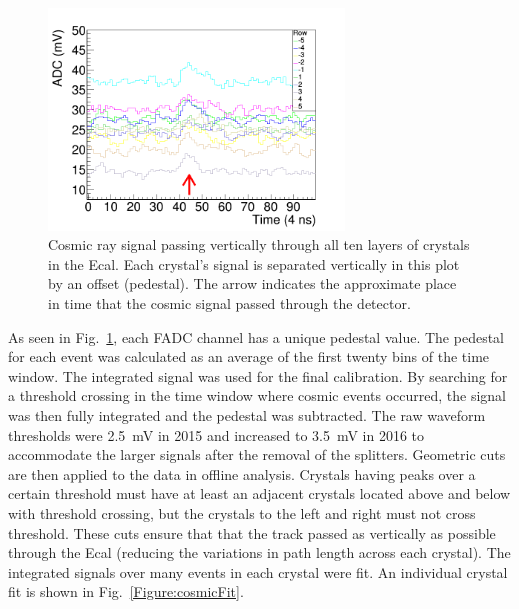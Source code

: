 \documentclass[12pt]{report}
\begin{document}
\begin{figure}[H]
  \centering
      \includegraphics[width=0.7\textwidth]{pics/performance/cosmicSignal.png}
  \caption[Real cosmic ray signal in raw FADC waveform passing vertically through Ecal]{Cosmic ray signal passing vertically through all ten layers of crystals in the Ecal. Each crystal's signal is separated vertically in this plot by an offset (pedestal). The arrow indicates the approximate place in time that the cosmic signal passed through the detector.}
  \label{Figure:cosmicSig}
\end{figure}

As seen in Fig.~\ref{Figure:cosmicSig}, each FADC channel has a unique pedestal value. The pedestal for each event was calculated as an average of the first twenty bins of the time window. The integrated signal was used for the final calibration. By searching for a threshold crossing in the time window where cosmic events occurred, the signal was then fully integrated and the pedestal was subtracted. The raw waveform thresholds were 2.5~mV in 2015 and increased to 3.5~mV in 2016 to accommodate the larger signals after the removal of the splitters. Geometric cuts are then applied to the data in offline analysis. Crystals having peaks over a certain threshold must have at least an adjacent crystals located above and below with threshold crossing, but the crystals to the left and right must not cross threshold. These cuts ensure that that the track passed as vertically as possible through the Ecal (reducing the variations in path length across each crystal). The integrated signals over many events in each crystal were fit. An individual crystal fit is shown in Fig.~\ref{Figure:cosmicFit}.
\end{document}
